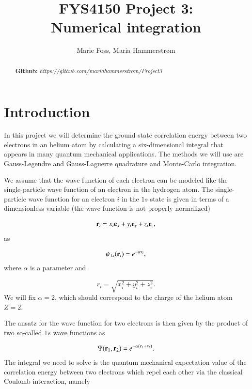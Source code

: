 \documentclass{article}
\title{\textbf{FYS4150 Project 3: \\Numerical integration}}
\author{Marie Foss, Maria Hammerstr{{\o}}m}
\date{} %
\begin{document}
\maketitle

\begin{abstract}
	\noindent \lipsum[1]
	\vspace*{2ex}
	
	\noindent \textbf{Github:} \textit{https://github.com/mariahammerstrom/Project3}
	\vspace*{2ex}
\end{abstract}




\section{Introduction}
In this project we will determine the ground state correlation energy between two electrons in an helium atom by calculating a six-dimensional integral that appears in many quantum mechanical applications. The methods we will use are Gauss-Legendre and Gauss-Laguerre quadrature and Monte-Carlo integration. 

We assume that the wave function of each electron can be modeled like the single-particle wave function of an electron in the hydrogen atom. The single-particle wave function  for an electron $i$ in the $1s$ state  is given in terms of a dimensionless variable    (the wave function is not properly normalized)

\begin{equation*}
	{\bf r}_i =  x_i {\bf e}_x + y_i {\bf e}_y +z_i {\bf e}_z ,
\end{equation*}
as

\begin{equation*}
	\psi_{1s}({\bf r}_i)  =   e^{-\alpha r_i},
\end{equation*}
where $\alpha$ is a parameter and 

\begin{equation*}
	r_i = \sqrt{x_i^2+y_i^2+z_i^2}.
\end{equation*}
We will fix $\alpha=2$, which should correspond to the charge of the helium atom $Z=2$. 

The ansatz for the wave function for two electrons is then given by the product of two 
so-called $1s$ wave functions as 

\begin{equation}
	\Psi({\bf r}_1,{\bf r}_2)  =   e^{-\alpha (r_1+r_2)}.
\end{equation}
The integral we need to solve is the quantum mechanical expectation value of the correlation energy between two electrons which repel each other via the classical Coulomb interaction, namely
\end{document}
